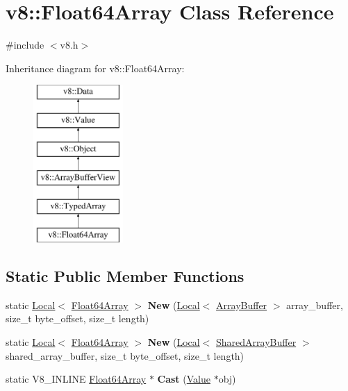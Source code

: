 \hypertarget{classv8_1_1Float64Array}{}\section{v8\+:\+:Float64\+Array Class Reference}
\label{classv8_1_1Float64Array}


{\ttfamily \#include $<$v8.\+h$>$}

Inheritance diagram for v8\+:\+:Float64\+Array\+:\begin{figure}[H]
\begin{center}
\leavevmode
\includegraphics[height=6.000000cm]{classv8_1_1Float64Array}
\end{center}
\end{figure}
\subsection*{Static Public Member Functions}
\begin{DoxyCompactItemize}
\item 
\hypertarget{classv8_1_1Float64Array_a6e12e5ced578a357cfd049e036c4d6d6}{}static \hyperlink{classv8_1_1Local}{Local}$<$ \hyperlink{classv8_1_1Float64Array}{Float64\+Array} $>$ {\bfseries New} (\hyperlink{classv8_1_1Local}{Local}$<$ \hyperlink{classv8_1_1ArrayBuffer}{Array\+Buffer} $>$ array\+\_\+buffer, size\+\_\+t byte\+\_\+offset, size\+\_\+t length)\label{classv8_1_1Float64Array_a6e12e5ced578a357cfd049e036c4d6d6}

\item 
\hypertarget{classv8_1_1Float64Array_aff414a8613e468f7deb29996f049e130}{}static \hyperlink{classv8_1_1Local}{Local}$<$ \hyperlink{classv8_1_1Float64Array}{Float64\+Array} $>$ {\bfseries New} (\hyperlink{classv8_1_1Local}{Local}$<$ \hyperlink{classv8_1_1SharedArrayBuffer}{Shared\+Array\+Buffer} $>$ shared\+\_\+array\+\_\+buffer, size\+\_\+t byte\+\_\+offset, size\+\_\+t length)\label{classv8_1_1Float64Array_aff414a8613e468f7deb29996f049e130}

\item 
\hypertarget{classv8_1_1Float64Array_a936ee8e8cb2cb892cc5369e3ee6a7784}{}static V8\+\_\+\+I\+N\+L\+I\+N\+E \hyperlink{classv8_1_1Float64Array}{Float64\+Array} $\ast$ {\bfseries Cast} (\hyperlink{classv8_1_1Value}{Value} $\ast$obj)\label{classv8_1_1Float64Array_a936ee8e8cb2cb892cc5369e3ee6a7784}

\end{DoxyCompactItemize}
